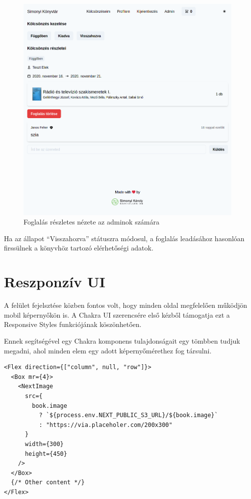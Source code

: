 \begin{figure}[!ht]
  \centering
  \includegraphics[width=150mm, keepaspectratio]{figures/order-admin-detail.png}
  \caption{Foglalás részletes nézete az adminok számára}
  \label{fig:OrderAdminDetail}
\end{figure}

Ha az állapot ``Visszahozva'' státuszra módosul, a foglalás leadásához hasonlóan firssülnek a könyvhöz tartozó elérhetőségi adatok.

\section{Reszponzív UI}

A felület fejelsztése közben fontos volt, hogy minden oldal megfelelően működjön mobil képernyőkön is.
A Chakra UI szerencsére első kézből támogatja ezt a Responsive Styles funkciójának köszönhetően.

Ennek segítségével egy Chakra komponens tulajdonságait egy tömbben tudjuk megadni, ahol minden elem egy adott képernyőmérethez
fog társulni.

\begin{lstlisting}[caption=Chakra UI Responsive Styles használata]
<Flex direction={["column", null, "row"]}>
  <Box mr={4}>
    <NextImage
      src={
        book.image
          ? `${process.env.NEXT_PUBLIC_S3_URL}/${book.image}`
          : "https://via.placeholer.com/200x300"
      }
      width={300}
      height={450}
    />
  </Box>
  {/* Other content */}
</Flex>
\end{lstlisting}

